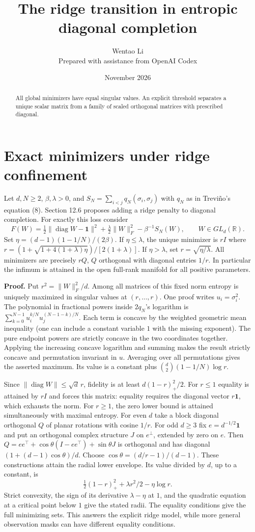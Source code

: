 \documentclass[10pt]{article}
\title{The ridge transition in entropic diagonal completion}
\author{Wentao Li\\{\small Prepared with assistance from OpenAI Codex}}
\date{November 2026}
\begin{document}
\maketitle
\begin{abstract}
All global minimizers have equal singular values. An explicit threshold separates a unique scalar matrix from a family of scaled orthogonal matrices with prescribed diagonal.
\end{abstract}
\section*{Exact minimizers under ridge confinement}
Let $d,N\ge2$, $\beta,\lambda>0$, and $S_N=\sum_{i<j}q_N(\sigma_i,\sigma_j)$ with $q_N$ as in Treviño's equation (8). Section 12.6 proposes adding a ridge penalty to diagonal completion. For exactly this loss consider
\[
 F(W)=\tfrac12\|\operatorname{diag}W-\mathbf1\|^2+\tfrac{\lambda}{2}\|W\|_F^2-\beta^{-1}S_N(W),\qquad W\in GL_d(\mathbb R).
\]
Set $\eta=(d-1)(1-1/N)/(2\beta)$. If $\eta\le\lambda$, the unique minimizer is $rI$ where
$r=(1+\sqrt{1+4(1+\lambda)\eta})/[2(1+\lambda)]$.
If $\eta>\lambda$, set $r=\sqrt{\eta/\lambda}$. All minimizers are precisely $rQ$, $Q$ orthogonal with diagonal entries $1/r$. In particular the infimum is attained in the open full-rank manifold for all positive parameters.

\textbf{Proof.} Put $r^2=\|W\|_F^2/d$. Among all matrices of this fixed norm entropy is uniquely maximized in singular values at $(r,\ldots,r)$. One proof writes $u_i=\sigma_i^2$. The polynomial in fractional powers inside $2q_N$'s logarithm is
$\sum_{k=0}^{N-1}u_i^{k/N}u_j^{(N-1-k)/N}$.
Each term is concave by the weighted geometric mean inequality (one can include a constant variable $1$ with the missing exponent). The pure endpoint powers are strictly concave in the two coordinates together. Applying the increasing concave logarithm and summing makes the result strictly concave and permutation invariant in $u$. Averaging over all permutations gives the asserted maximum. Its value is a constant plus $\binom d2(1-1/N)\log r$.

Since $\|\operatorname{diag}W\|\le\sqrt d\,r$, fidelity is at least $d(1-r)_+^2/2$. For $r\le1$ equality is attained by $rI$ and forces this matrix: equality requires the diagonal vector $r\mathbf1$, which exhausts the norm. For $r\ge1$, the zero lower bound is attained simultaneously with maximal entropy. For even $d$ take a block diagonal orthogonal $Q$ of planar rotations with cosine $1/r$. For odd $d\ge3$ fix $e=d^{-1/2}\mathbf1$ and put an orthogonal complex structure $J$ on $e^\perp$, extended by zero on $e$. Then $Q=ee^\top+\cos\theta(I-ee^\top)+\sin\theta J$ is orthogonal and has diagonal $(1+(d-1)\cos\theta)/d$. Choose $\cos\theta=(d/r-1)/(d-1)$. These constructions attain the radial lower envelope. Its value divided by $d$, up to a constant, is
\[
 \tfrac12(1-r)_+^2+\lambda r^2/2-\eta\log r .
\]
Strict convexity, the sign of its derivative $\lambda-\eta$ at $1$, and the quadratic equation at a critical point below $1$ give the stated radii. The equality conditions give the full minimizing sets. This answers the explicit ridge model, while more general observation masks can have different equality conditions.
\end{document}
